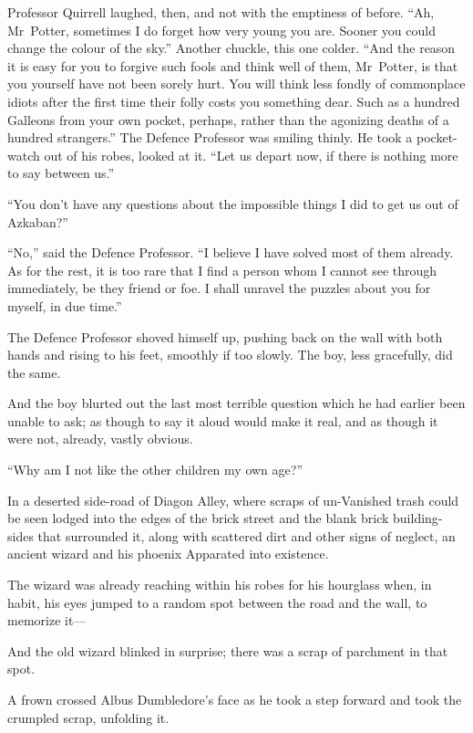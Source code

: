 Professor Quirrell laughed, then, and not with the emptiness of before. “Ah, Mr~Potter, sometimes I do forget how very young you are. Sooner you could change the colour of the sky.” Another chuckle, this one colder. “And the reason it is easy for you to forgive such fools and think well of them, Mr~Potter, is that you yourself have not been sorely hurt. You will think less fondly of commonplace idiots after the first time their folly costs you something dear. Such as a hundred Galleons from your own pocket, perhaps, rather than the agonizing deaths of a hundred strangers.” The Defence Professor was smiling thinly. He took a pocket-watch out of his robes, looked at it. “Let us depart now, if there is nothing more to say between us.”

“You don’t have any questions about the impossible things I did to get us out of Azkaban?”

“No,” said the Defence Professor. “I believe I have solved most of them already. As for the rest, it is too rare that I find a person whom I cannot see through immediately, be they friend or foe. I shall unravel the puzzles about you for myself, in due time.”

The Defence Professor shoved himself up, pushing back on the wall with both hands and rising to his feet, smoothly if too slowly. The boy, less gracefully, did the same.

And the boy blurted out the last most terrible question which he had earlier been unable to ask; as though to say it aloud would make it real, and as though it were not, already, vastly obvious.

“Why am I not like the other children my own age?”

\later

In a deserted side-road of Diagon Alley, where scraps of un-Vanished trash could be seen lodged into the edges of the brick street and the blank brick building-sides that surrounded it, along with scattered dirt and other signs of neglect, an ancient wizard and his phoenix Apparated into existence.

The wizard was already reaching within his robes for his hourglass when, in habit, his eyes jumped to a random spot between the road and the wall, to memorize it—

And the old wizard blinked in surprise; there was a scrap of parchment in that spot.

A frown crossed Albus Dumbledore’s face as he took a step forward and took the crumpled scrap, unfolding it.

